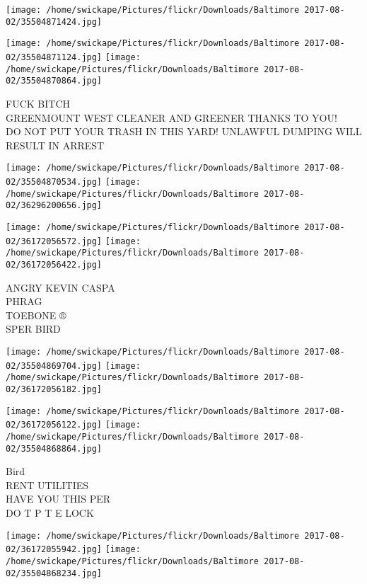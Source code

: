 \documentclass[10pt,letterpaper]{article}
\begin{document}
\texttt{[image: /home/swickape/Pictures/flickr/Downloads/Baltimore 2017-08-02/35504871424.jpg]}

\vspace{0.25in}
\texttt{[image: /home/swickape/Pictures/flickr/Downloads/Baltimore 2017-08-02/35504871124.jpg]}
\texttt{[image: /home/swickape/Pictures/flickr/Downloads/Baltimore 2017-08-02/35504870864.jpg]}

FUCK BITCH\\
GREENMOUNT WEST CLEANER AND GREENER THANKS TO YOU!\\
DO NOT PUT YOUR TRASH IN THIS YARD!  UNLAWFUL DUMPING WILL RESULT IN ARREST\\
\pagebreak

\texttt{[image: /home/swickape/Pictures/flickr/Downloads/Baltimore 2017-08-02/35504870534.jpg]}
\texttt{[image: /home/swickape/Pictures/flickr/Downloads/Baltimore 2017-08-02/36296200656.jpg]}

\texttt{[image: /home/swickape/Pictures/flickr/Downloads/Baltimore 2017-08-02/36172056572.jpg]}
\texttt{[image: /home/swickape/Pictures/flickr/Downloads/Baltimore 2017-08-02/36172056422.jpg]}

ANGRY KEVIN CASPA\\
PHRAG\\
TOEBONE ®\\
SPER BIRD\\
\pagebreak

\texttt{[image: /home/swickape/Pictures/flickr/Downloads/Baltimore 2017-08-02/35504869704.jpg]}
\texttt{[image: /home/swickape/Pictures/flickr/Downloads/Baltimore 2017-08-02/36172056182.jpg]}

\texttt{[image: /home/swickape/Pictures/flickr/Downloads/Baltimore 2017-08-02/36172056122.jpg]}
\texttt{[image: /home/swickape/Pictures/flickr/Downloads/Baltimore 2017-08-02/35504868864.jpg]}

Bird\\
RENT UTILITIES\\
HAVE YOU THIS PER\\
DO T P T E LOCK\\
\pagebreak

\texttt{[image: /home/swickape/Pictures/flickr/Downloads/Baltimore 2017-08-02/36172055942.jpg]}
\texttt{[image: /home/swickape/Pictures/flickr/Downloads/Baltimore 2017-08-02/35504868234.jpg]}
\end{document}

